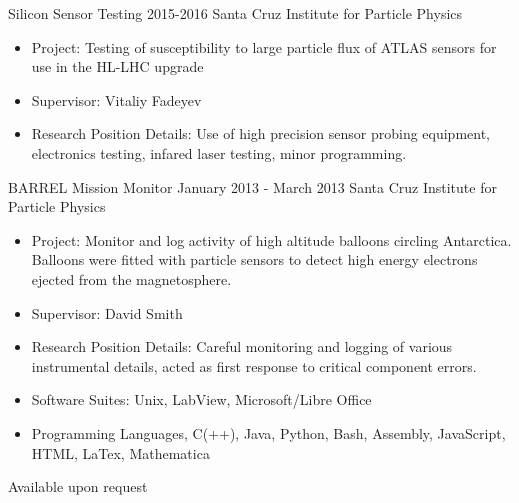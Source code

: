 \WorkEntry
    {Silicon Sensor Testing}
    {2015-2016}
    {Santa Cruz Institute for Particle Physics}
    {\begin{itemize}
        \item[] Project:
            Testing of susceptibility to large particle
            flux of ATLAS sensors for use in the HL-LHC upgrade
        \item[] Supervisor: 
            Vitaliy Fadeyev
        \item[] Research Position Details:
            Use of high precision sensor probing equipment,
            electronics testing, infared laser testing, minor programming.
    \end{itemize}}
\sepspace

\WorkEntry
    {BARREL Mission Monitor}
    {January 2013 - March 2013}
    {Santa Cruz Institute for Particle Physics}
    {\begin{itemize}
        \item[] Project:
            Monitor and log activity of high altitude balloons circling Antarctica.
            Balloons were fitted with particle sensors to detect high energy electrons
            ejected from the magnetosphere.
        \item[] Supervisor: 
            David Smith
        \item[] Research Position Details:
            Careful monitoring and logging of various instrumental details,
            acted as first response to critical component errors.
    \end{itemize}}
\sepspace

\begin{itemize}
    \item Software Suites: Unix, LabView, Microsoft/Libre Office
    \item Programming Languages, C(++), Java, Python, Bash, Assembly, JavaScript, HTML, LaTex, Mathematica

\end{itemize}



Available upon request

